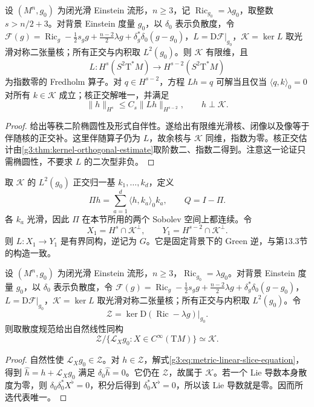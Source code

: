 \begin{theorem}\label{g3:thm:einstein-linear-fredholm}
	设 \((M^n,g_0)\) 为闭光滑 Einstein 流形，\(n\ge3\)，记 \(\operatorname{Ric}_{g_0}=\lambda g_0\)，取整数 \(s>n/2+3\)。对背景 Einstein 度量 \(g_0\)，以 \(\delta_0\) 表示负散度，令 \(\mathcal F(g)=\operatorname{Ric}_g-\tfrac12s_gg+\tfrac{n-2}2\lambda g+\delta_g^*\delta_0(g-g_0)\)，\(L=\mathrm D\mathcal F|_{g_0}\)，\(\mathcal K=\ker L\) 取光滑对称二张量核；所有正交与内积取 \(L^2(g_0)\)。则 \(\mathcal K\) 有限维，且
	\[
		L:H^s(S^2\mathrm T^*M)\longrightarrow H^{s-2}(S^2\mathrm T^*M)
	\]
	为指数零的 Fredholm 算子。对 \(q\in H^{s-2}\)，方程 \(Lh=q\) 可解当且仅当 \(\langle q,k\rangle_0=0\) 对所有 \(k\in\mathcal K\) 成立；核正交解唯一，并满足
	\begin{equation}\label{g3:eq:einstein-complement-estimate}
		\|h\|_{H^s}\le C_s\|Lh\|_{H^{s-2}},\qquad h\perp\mathcal K.
	\end{equation}
\end{theorem}
\begin{proof}
	给出等秩二阶椭圆性及形式自伴性。遂给出有限维光滑核、闭像以及像等于伴随核的正交补。这里伴随算子仍为 \(L\)，故余核与 \(\mathcal K\) 同维，指数为零。核正交估计由\cref{g3:thm:kernel-orthogonal-estimate}取阶数二、指数二得到。注意这一论证只需椭圆性，不要求 \(L\) 的二次型非负。
\end{proof}

取 \(\mathcal K\) 的 \(L^2(g_0)\) 正交归一基 \(k_1,\ldots,k_d\)，定义
\[
	\Pi h=\sum_{a=1}^d\langle h,k_a\rangle_0k_a,\qquad Q=I-\Pi.
\]
各 \(k_a\) 光滑，因此 \(\Pi\) 在本节所用的两个 Sobolev 空间上都连续。令
\[
	X_1=H^s\cap\mathcal K^\perp,\qquad Y_1=H^{s-2}\cap\mathcal K^\perp.
\]
则 \(L:X_1\to Y_1\) 是有界同构，逆记为 \(G\)。它是固定背景下的 Green 逆，与第13.3节的构造一致。

\begin{proposition}\label{g3:prop:einstein-gauge-quotient-tangent}
	设 \((M^n,g_0)\) 为闭光滑 Einstein 流形，\(n\ge3\)，\(\operatorname{Ric}_{g_0}=\lambda g_0\)。对背景 Einstein 度量 \(g_0\)，以 \(\delta_0\) 表示负散度，令 \(\mathcal F(g)=\operatorname{Ric}_g-\tfrac12s_gg+\tfrac{n-2}2\lambda g+\delta_g^*\delta_0(g-g_0)\)，\(L=\mathrm D\mathcal F|_{g_0}\)，\(\mathcal K=\ker L\) 取光滑对称二张量核；所有正交与内积取 \(L^2(g_0)\)。令
	\[
		\mathcal Z=\ker\mathrm D(\operatorname{Ric}-\lambda g)|_{g_0}.
	\]
	则取散度规范给出自然线性同构
	\[
		\mathcal Z/\{\mathcal L_Xg_0:X\in C^\infty(\mathrm TM)\}
		\simeq\mathcal K.
	\]
\end{proposition}
\begin{proof}
	自然性使 \(\mathcal L_Xg_0\in\mathcal Z\)。对 \(h\in\mathcal Z\)，解式\eqref{g3:eq:metric-linear-slice-equation}，得到 \(\widehat h=h+\mathcal L_Xg_0\) 满足 \(\delta_0\widehat h=0\)。它仍在 \(\mathcal Z\)，故属于 \(\mathcal K\)。若一个 Lie 导数本身散度为零，则 \(\delta_0\delta_0^*X^\flat=0\)，积分后得到 \(\delta_0^*X^\flat=0\)，所以该 Lie 导数就是零。因而所选代表唯一。
\end{proof}

